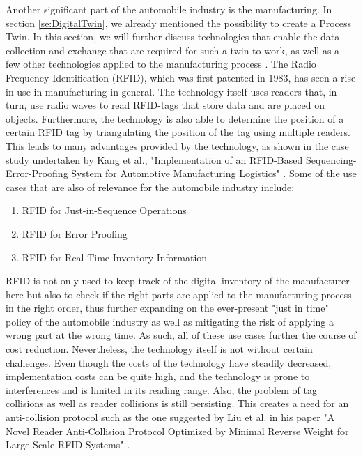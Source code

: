 Another significant part of the automobile industry is the manufacturing. In section \ref{se:DigitalTwin}, we already mentioned the possibility to create a Process Twin. In this section, we will further discuss technologies that enable the data collection and exchange that are required for such a twin to work, as well as a few other technologies applied to the manufacturing process \cite{lu2019potential}. The Radio Frequency Identification (RFID), which was first patented in 1983, has seen a rise in use in manufacturing in general. The technology itself uses readers that, in turn, use radio waves to read RFID-tags that store data and are placed on objects. Furthermore, the technology is also able to determine the position of a certain RFID tag by triangulating the position of the tag using multiple readers. This leads to many advantages provided by the technology, as shown in the case study undertaken by Kang et al., "Implementation of an RFID-Based Sequencing-Error-Proofing System for Automotive Manufacturing Logistics" \cite{kang2018implementation}. Some of the use cases that are also of relevance for the automobile industry include:

\begin{enumerate}
\item RFID for Just-in-Sequence Operations
\item RFID for Error Proofing
\item RFID for Real-Time Inventory Information
\end{enumerate}

RFID is not only used to keep track of the digital inventory of the manufacturer here but also to check if the right parts are applied to the manufacturing process in the right order, thus further expanding on the ever-present "just in time" policy of the automobile industry as well as mitigating the risk of applying a wrong part at the wrong time. As such, all of these use cases further the course of cost reduction. Nevertheless, the technology itself is not without certain challenges. Even though the costs of the technology have steadily decreased, implementation costs can be quite high, and the technology is prone to interferences and is limited in its reading range. Also, the problem of tag collisions as well as reader collisions is still persisting. This creates a need for an anti-collision protocol such as the one suggested by Liu et al. in his paper "A Novel Reader Anti-Collision Protocol Optimized by Minimal Reverse Weight for Large-Scale RFID Systems" \cite{liu2022novel}.

